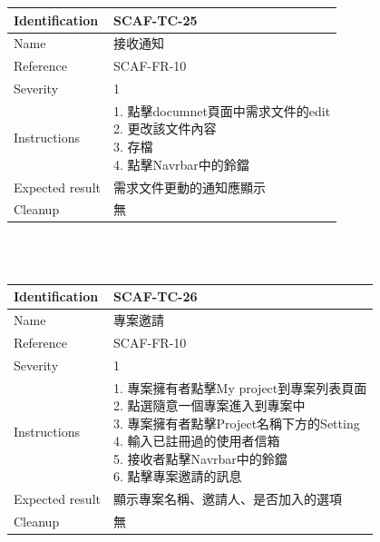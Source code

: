 \documentclass{report}
\begin{document}
\begin{tabularx}{\textwidth}{
  |p{}%
  |p{}|%
  }
  \hline
  \centering Identification &  SCAF-TC-25 \\
  \hline
  \centering Name & 接收通知 \\
  \hline
  \centering Reference & SCAF-FR-10 \\
  \hline
  \centering Severity & 1 \\
  \hline
  \centering Instructions & 
  \makecell[l]{
    1. 點擊documnet頁面中需求文件的edit \\
    2. 更改該文件內容  \\
    3. 存檔  \\
    4. 點擊Navrbar中的鈴鐺
  }\\
  \hline
  \centering Expected result & 需求文件更動的通知應顯示 \\
  \hline
  \centering Cleanup & 無 \\
  \hline
\end{tabularx}
\\
\newline
\\
\begin{tabularx}{\textwidth}{
  |p{}%
  |p{}|%
  }
  \hline
  \centering Identification &  SCAF-TC-26 \\
  \hline
  \centering Name & 專案邀請 \\
  \hline
  \centering Reference & SCAF-FR-10 \\
  \hline
  \centering Severity & 1 \\
  \hline
  \centering Instructions & 
  \makecell[l]{
    1. 專案擁有者點擊My project到專案列表頁面 \\
    2. 點選隨意一個專案進入到專案中 \\
    3. 專案擁有者點擊Project名稱下方的Setting \\
    4. 輸入已註冊過的使用者信箱 \\
    5. 接收者點擊Navrbar中的鈴鐺 \\
    6. 點擊專案邀請的訊息 
  }\\
  \hline
  \centering Expected result & 顯示專案名稱、邀請人、是否加入的選項 \\
  \hline
  \centering Cleanup & 無 \\
  \hline
\end{tabularx}
\end{document}
